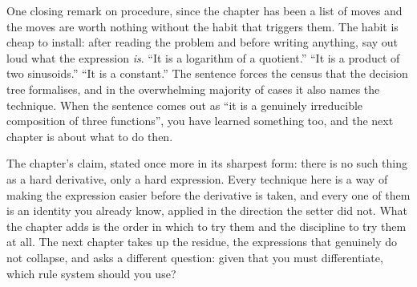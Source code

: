 One closing remark on procedure, since the chapter has been a list of moves and the moves are worth nothing without the habit that triggers them. The habit is cheap to install: after reading the problem and before writing anything, say out loud what the expression \emph{is}. ``It is a logarithm of a quotient.'' ``It is a product of two sinusoids.'' ``It is a constant.'' The sentence forces the census that the decision tree formalises, and in the overwhelming majority of cases it also names the technique. When the sentence comes out as ``it is a genuinely irreducible composition of three functions'', you have learned something too, and the next chapter is about what to do then.

The chapter's claim, stated once more in its sharpest form: there is no such thing as a hard derivative, only a hard expression. Every technique here is a way of making the expression easier before the derivative is taken, and every one of them is an identity you already know, applied in the direction the setter did not. What the chapter adds is the order in which to try them and the discipline to try them at all. The next chapter takes up the residue, the expressions that genuinely do not collapse, and asks a different question: given that you must differentiate, which rule system should you use?

